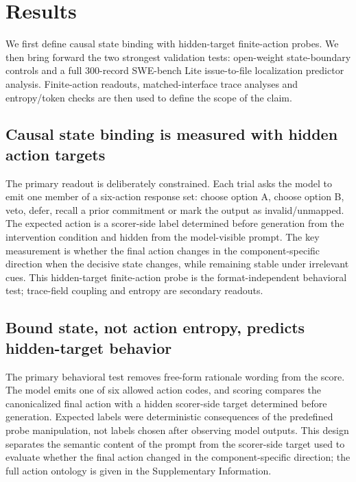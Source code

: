 ﻿\documentclass[preprint,12pt,authoryear]{elsarticle}
\begin{document}
\section{Results}

We first define causal state binding with hidden-target finite-action probes. We then bring forward the two strongest validation tests: open-weight state-boundary controls and a full 300-record SWE-bench Lite issue-to-file localization predictor analysis. Finite-action readouts, matched-interface trace analyses and entropy/token checks are then used to define the scope of the claim.

\subsection{Causal state binding is measured with hidden action targets}

The primary readout is deliberately constrained. Each trial asks the model to emit one member of a six-action response set: choose option A, choose option B, veto, defer, recall a prior commitment or mark the output as invalid/unmapped. The expected action is a scorer-side label determined before generation from the intervention condition and hidden from the model-visible prompt. The key measurement is whether the final action changes in the component-specific direction when the decisive state changes, while remaining stable under irrelevant cues. This hidden-target finite-action probe is the format-independent behavioral test; trace-field coupling and entropy are secondary readouts.

\subsection{Bound state, not action entropy, predicts hidden-target behavior}

The primary behavioral test removes free-form rationale wording from the score. The model emits one of six allowed action codes, and scoring compares the canonicalized final action with a hidden scorer-side target determined before generation. Expected labels were deterministic consequences of the predefined probe manipulation, not labels chosen after observing model outputs. This design separates the semantic content of the prompt from the scorer-side target used to evaluate whether the final action changed in the component-specific direction; the full action ontology is given in the Supplementary Information.
\end{document}
